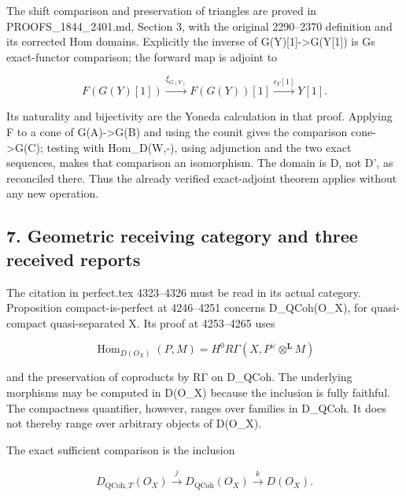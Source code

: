 \documentclass[11pt]{article}
\begin{document}
The shift comparison and preservation of triangles are proved in PROOFS\_\allowbreak{}1844\_\allowbreak{}2401.md,\allowbreak{} Section 3,\allowbreak{} with the original 2290–\allowbreak{}2370 definition and its corrected Hom domains. Explicitly the inverse of G(Y)\allowbreak{}[1]\allowbreak{}\allowbreak{}->G(Y[1]\allowbreak{})\allowbreak{} is G\textquotesingle s exact-functor comparison; the forward map is adjoint to

\[
 F(G(Y)[1])\xrightarrow{\xi_{G(Y)}}F(G(Y))[1]
                         \xrightarrow{\epsilon_Y[1]}Y[1].
\]

Its naturality and bijectivity are the Yoneda calculation in that proof. Applying F to a cone of G(A)\allowbreak{}\allowbreak{}->G(B)\allowbreak{} and using the counit gives the comparison cone\allowbreak{}->G(C)\allowbreak{}; testing with Hom\_\allowbreak{}D(W,\allowbreak{}-)\allowbreak{},\allowbreak{} using adjunction and the two exact sequences,\allowbreak{} makes that comparison an isomorphism. The domain is D,\allowbreak{} not D',\allowbreak{} as reconciled there. Thus the already verified exact-adjoint theorem applies without any new operation.

\subsection{7. Geometric receiving category and three received reports}\label{proofs-11121-11450-geometric-receiving-category-and-three-received-reports}

The citation in perfect.tex 4323–\allowbreak{}4326 must be read in its actual category. Proposition compact-is-perfect at 4246–\allowbreak{}4251 concerns D\_\allowbreak{}QCoh(O\_\allowbreak{}X)\allowbreak{},\allowbreak{} for quasi-compact quasi-separated X. Its proof at 4253–\allowbreak{}4265 uses

\[
 \operatorname{Hom}_{D(O_X)}(P,M)
    =H^0R\Gamma(X,P^\vee\otimes^{\mathbf L}M)
\]

and the preservation of coproducts by RΓ on D\_\allowbreak{}QCoh. The underlying morphisms may be computed in D(O\_\allowbreak{}X)\allowbreak{} because the inclusion is fully faithful. The compactness quantifier,\allowbreak{} however,\allowbreak{} ranges over families in D\_\allowbreak{}QCoh. It does not thereby range over arbitrary objects of D(O\_\allowbreak{}X)\allowbreak{}.

The exact sufficient comparison is the inclusion

\[
 D_{\mathrm{QCoh},T}(O_X)
    \xrightarrow{\ j\ }D_{\mathrm{QCoh}}(O_X)
    \xrightarrow{\ k\ }D(O_X).
\]
\end{document}
